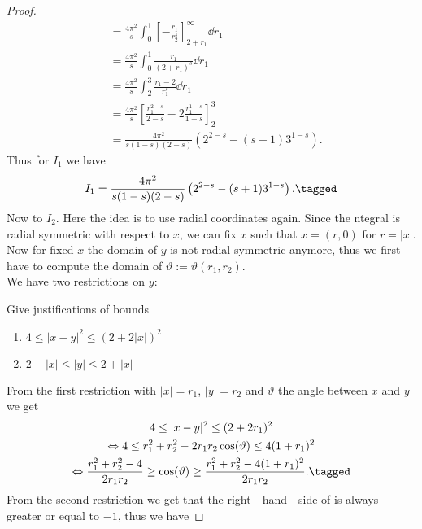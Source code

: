 \begin{proof}
\begin{align*}
		 & = \frac{4\pi^2}{s} \int_0^1 \left[- \frac{r_1}{r_2^s} \right]_{2 + r_1}^\infty \dd{r_1} \\
		 & = \frac{4\pi^2}{s} \int_0^1 \frac{r_1}{(2 + r_1)^s} \dd{r_1} \\
		 & = \frac{4\pi^2}{s} \int_2^3 \frac{r_1 - 2}{r_1^s} \dd{r_1} \\
		 & = \frac{4\pi^2}{s} \left[\frac{r_1^{2 - s}}{2 - s} - 2 \frac{r_1^{1 - s}}{1 - s} \right]_2^3 \\
		 & = \frac{4\pi^2}{s(1 - s)(2 - s)} \left(2^{2 - s} - (s + 1) 3^{1 - s} \right).
	\end{align*}
	Thus for \( I_1 \) we have
	\begin{gather*}
		I_1 = \frac{4\pi^2}{s(1 - s)(2 - s)} \left(2^{2 - s} - (s + 1) 3^{1 - s} \right). \tagged\label{eq:203}
	\end{gather*}
	Now to \( I_2 \). Here the idea is to use radial coordinates again. Since the ntegral
	is radial symmetric with respect to \( x \), we can fix \( x \) such that \( x = (r,
	0) \) for \( r = \lvert x\rvert \). Now for fixed \( x \) the domain of \( y \) is not
	radial symmetric anymore, thus we first have to compute the domain of \( \vartheta:=
	\vartheta (r_1, r_2) \). \\
	We have two restrictions on \( y \):
	\begin{TODO}
		Give justifications of bounds
	\end{TODO}
	\begin{enumerate}[label = (\arabic*)]
		\item \( 4 \leq \lvert x - y\rvert^2 \leq (2 + 2\lvert x\rvert)^2 \)
		\item \( 2 - \lvert x\rvert \leq \lvert y\rvert \leq 2 + \lvert x\rvert \)
	\end{enumerate}
	From the first restriction with \( \lvert x\rvert = r_1 \), \( \lvert y\rvert = r_2 \)
	and \( \vartheta \) the angle between \( x \) and \( y \) we get
	\begin{gather*}
		4 \leq \lvert x - y\rvert^2 \leq (2 + 2r_1)^2 \\
		\Leftrightarrow 4 \leq r_1^2 + r_2^2 - 2r_1 r_2 \cos(\vartheta) \leq 4(1 + r_1)^2 \\
		\Leftrightarrow \frac{r_1^2 + r_2^2 - 4}{2r_1 r_2} \geq \cos(\vartheta) \geq \frac{r_1^2 + r_2^2 - 4(1 + r_1)^2}{2r_1 r_2}. \tagged\label{eq:204}
	\end{gather*}
	From the second restriction we get that the right - hand - side of  is always
	greater or equal to \( - 1 \), thus we have

\end{proof}
